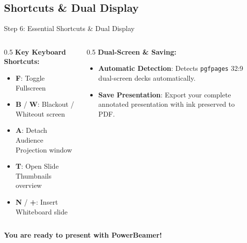 \documentclass[aspectratio=43]{beamer}
\begin{document}
\subsection{Shortcuts \& Dual Display}
\begin{frame}{Step 6: Essential Shortcuts \& Dual Display}
  \begin{columns}[T]
    \begin{column}{0.5\textwidth}
      \textbf{Key Keyboard Shortcuts:}
      \begin{itemize}
        \item \textbf{F}: Toggle Fullscreen
        \item \textbf{B} / \textbf{W}: Blackout / Whiteout screen
        \item \textbf{A}: Detach Audience Projection window
        \item \textbf{T}: Open Slide Thumbnails overview
        \item \textbf{N} / \textbf{+}: Insert Whiteboard slide
      \end{itemize}
    \end{column}
    \begin{column}{0.5\textwidth}
      \textbf{Dual-Screen \& Saving:}
      \begin{itemize}
        \item \textbf{Automatic Detection}: Detects \texttt{pgfpages} 32:9 dual-screen decks automatically.
        \item \textbf{Save Presentation}: Export your complete annotated presentation with ink preserved to PDF.
      \end{itemize}
    \end{column}
  \end{columns}

  \vspace{1.5em}
  \centering
  \textbf{You are ready to present with PowerBeamer!}

\end{frame}
\end{document}
